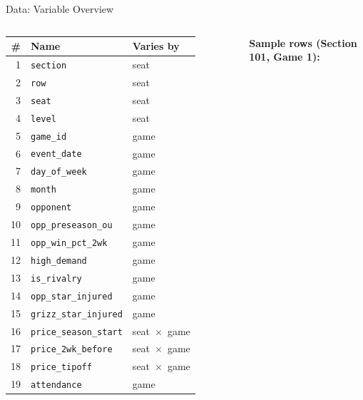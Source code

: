 \documentclass{beamer}
\begin{document}
\begin{frame}{Data: Variable Overview}
\vspace{-0.3em}
\begin{columns}[T]

\scriptsize
\begin{tabular}{rll}
\toprule
\textbf{\#} & \textbf{Name} & \textbf{Varies by} \\
\midrule
1  & \texttt{section}              & seat \\
2  & \texttt{row}                  & seat \\
3  & \texttt{seat}                 & seat \\
4  & \texttt{level}                & seat \\
5  & \texttt{game\_id}             & game \\
6  & \texttt{event\_date}          & game \\
7  & \texttt{day\_of\_week}        & game \\
8  & \texttt{month}                & game \\
9  & \texttt{opponent}             & game \\
10 & \texttt{opp\_preseason\_ou}   & game \\
11 & \texttt{opp\_win\_pct\_2wk}   & game \\
12 & \texttt{high\_demand}         & game \\
13 & \texttt{is\_rivalry}          & game \\
14 & \texttt{opp\_star\_injured}   & game \\
15 & \texttt{grizz\_star\_injured} & game \\
16 & \texttt{price\_season\_start} & seat $\!\times\!$ game \\
17 & \texttt{price\_2wk\_before}   & seat $\!\times\!$ game \\
18 & \texttt{price\_tipoff}        & seat $\!\times\!$ game \\
19 & \texttt{attendance}           & game \\
\bottomrule
\end{tabular}

\scriptsize
\textbf{Sample rows (Section 101, Game 1):}


\end{columns}
\end{frame}
\end{document}
